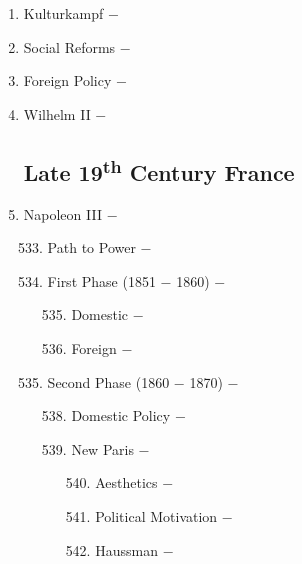 \documentclass[12pt]{article}
\begin{document}
\begin{enumerate}
\item Kulturkampf $-$ 

\item Social Reforms $-$ 

\item Foreign Policy $-$ 

\item Wilhelm II $-$ 

\subsection{Late 19\textsuperscript{th} Century France}

\item Napoleon III $-$ 
\begin{enumerate}[label=\arabic{*}.]
\setcounter{enumii}{532}

\item Path to Power $-$ 

\item First Phase (1851 $-$ 1860) $-$ 

\begin{enumerate}[label=\arabic{*}.]
\setcounter{enumiii}{534}

\item Domestic $-$ 

\item Foreign $-$ 

\end{enumerate}
\setcounter{enumii}{536}

\item Second Phase (1860 $-$ 1870) $-$

\begin{enumerate}[label=\arabic{*}.]
\setcounter{enumiii}{537}

\item Domestic Policy $-$ 

\item New Paris $-$ 

\begin{enumerate}[label=\arabic{*}.]
\setcounter{enumiv}{539}

\item Aesthetics $-$ 

\item Political Motivation $-$ 

\item Haussman $-$ 

\end{enumerate}
\setcounter{enumiii}{542}


\end{enumerate}
\end{enumerate}
\end{enumerate}
\end{document}
